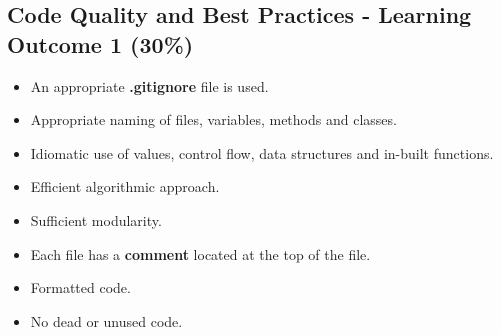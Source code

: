 \documentclass{article}
\begin{document}
\subsection*{Code Quality and Best Practices - Learning Outcome 1 (30\%)}
\begin{itemize}
    \item An appropriate \textbf{.gitignore} file is used. 
    \item Appropriate naming of files, variables, methods and classes.
    \item Idiomatic use of values, control flow, data structures and in-built functions.
    \item Efficient algorithmic approach.
    \item Sufficient modularity.
    \item Each file has a \textbf{comment} located at the top of the file. 
    \item Formatted code.
    \item No dead or unused code.
\end{itemize}  
\end{document}

